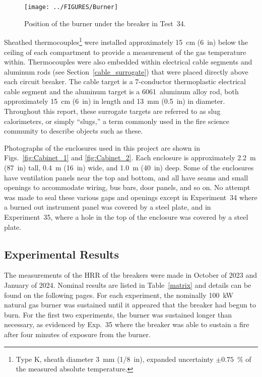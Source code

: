 \begin{figure}[ht]
\centering
\texttt{[image: ../FIGURES/Burner]}
\caption[Position of the burner] {Position of the burner under the breaker in Test~34.}
\label{fig:Burner}
\end{figure}

Sheathed thermocouples\footnote{Type K, sheath diameter 3~mm (1/8~in), expanded uncertainty $\pm 0.75$~\% of the measured absolute temperature.} were installed approximately 15~cm (6~in) below the ceiling of each compartment to provide a measurement of the gas temperature within. Thermocouples were also embedded within electrical cable segments and aluminum rods (see Section~\ref{cable_surrogate}) that were placed directly above each circuit breaker. The cable target is a 7-conductor thermoplastic electrical cable segment and the aluminum target is a 6061~aluminum alloy rod, both approximately  15~cm (6~in) in length and 13~mm (0.5~in) in diameter. Throughout this report, these surrogate targets are referred to as slug calorimeters, or simply ``slugs,'' a term commonly used in the fire science community to describe objects such as these.

Photographs of the enclosures used in this project are shown in Figs.~\ref{fig:Cabinet_1} and \ref{fig:Cabinet_2}. Each enclosure is approximately 2.2~m (87~in) tall, 0.4~m (16~in) wide, and 1.0~m (40~in) deep. Some of the enclosures have ventilation panels near the top and bottom, and all have seams and small openings to accommodate wiring, bus bars, door panels, and so on. No attempt was made to seal these various gaps and openings except in Experiment~34 where a burned out instrument panel was covered by a steel plate, and in Experiment~35, where a hole in the top of the enclosure was covered by a steel plate.



\subsection{Experimental Results}
\label{sec:results}

The measurements of the HRR of the breakers were made in October of 2023 and January of 2024. Nominal results are listed in Table~\ref{matrix} and details can be found on the following pages. For each experiment, the nominally 100~kW natural gas burner was sustained until it appeared that the breaker had begun to burn. For the first two experiments, the burner was sustained longer than necessary, as evidenced by Exp.~35 where the breaker was able to sustain a fire after four minutes of exposure from the burner.

